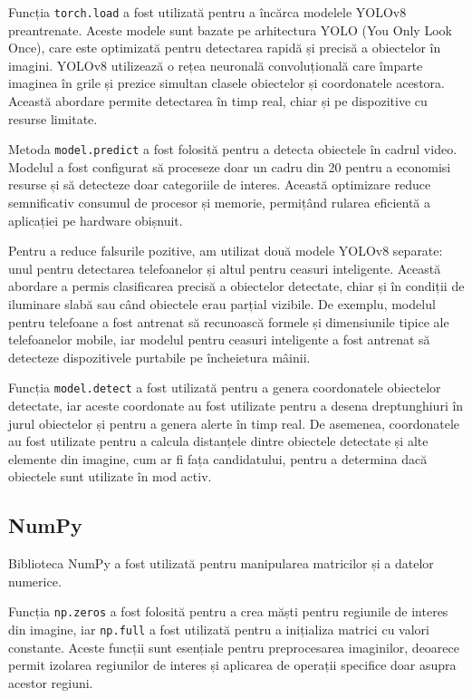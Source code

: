\documentclass[12pt,a4paper]{article}
\begin{document}
Funcția \texttt{torch.load} a fost utilizată pentru a încărca modelele YOLOv8 preantrenate. Aceste modele sunt bazate pe arhitectura YOLO (You Only Look Once), care este optimizată pentru detectarea rapidă și precisă a obiectelor în imagini\cite{redmon2018yolov3}. YOLOv8 utilizează o rețea neuronală convoluțională care împarte imaginea în grile și prezice simultan clasele obiectelor și coordonatele acestora. Această abordare permite detectarea în timp real, chiar și pe dispozitive cu resurse limitate.

Metoda \texttt{model.predict} a fost folosită pentru a detecta obiectele în cadrul video. Modelul a fost configurat să proceseze doar un cadru din 20 pentru a economisi resurse și să detecteze doar categoriile de interes. Această optimizare reduce semnificativ consumul de procesor și memorie, permițând rularea eficientă a aplicației pe hardware obișnuit.

Pentru a reduce falsurile pozitive, am utilizat două modele YOLOv8 separate: unul pentru detectarea telefoanelor și altul pentru ceasuri inteligente. Această abordare a permis clasificarea precisă a obiectelor detectate, chiar și în condiții de iluminare slabă sau când obiectele erau parțial vizibile. De exemplu, modelul pentru telefoane a fost antrenat să recunoască formele și dimensiunile tipice ale telefoanelor mobile, iar modelul pentru ceasuri inteligente a fost antrenat să detecteze dispozitivele purtabile pe încheietura mâinii.

Funcția \texttt{model.detect} a fost utilizată pentru a genera coordonatele obiectelor detectate, iar aceste coordonate au fost utilizate pentru a desena dreptunghiuri în jurul obiectelor și pentru a genera alerte în timp real. De asemenea, coordonatele au fost utilizate pentru a calcula distanțele dintre obiectele detectate și alte elemente din imagine, cum ar fi fața candidatului, pentru a determina dacă obiectele sunt utilizate în mod activ.

\subsection{NumPy}
Biblioteca NumPy a fost utilizată pentru manipularea matricilor și a datelor numerice\cite{harris2020array}. 

Funcția \texttt{np.zeros} a fost folosită pentru a crea măști pentru regiunile de interes din imagine, iar \texttt{np.full} a fost utilizată pentru a inițializa matrici cu valori constante. Aceste funcții sunt esențiale pentru preprocesarea imaginilor, deoarece permit izolarea regiunilor de interes și aplicarea de operații specifice doar asupra acestor regiuni\cite{goodfellow2016deep}.
\end{document}
